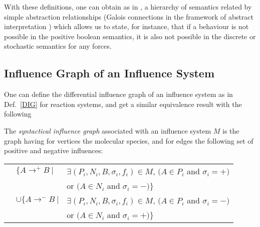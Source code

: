 \documentclass{llncs}
\newcommand{\ra}{\rightarrow}
\begin{document}
With these definitions, one can obtain as in \cite{FS08tcs}, a hierarchy of semantics related by simple abstraction relationships (Galois connections in the framework of abstract interpretation \cite{CC77popl})
which allows us to state, for instance, that if a behaviour is not possible in the positive boolean semantics, it is also not possible in the discrete or stochastic semantics for any forces.


\subsection{Influence Graph of an Influence System}

One can define the differential influence graph of an influence system
as in Def.~\ref{DIG} for reaction systems, and get a similar equivalence result with the following

\begin{definition}

The \emph{syntactical influence graph} associated with an influence system $M$ is
the graph having for vertices the molecular species, and for edges the
following set of positive and negative influences:

\begin{tabular}{lll}
&$\{A\ra^+B\ |$&$\exists (P_i, N_i, B, \sigma_i, f_i)\in M$, $(A\in P_i$ and $\sigma_i=+)$\\
&& or $(A\in N_i$ and $\sigma_i=-)\}$\\
&$\cup\{A\ra^-B\ |$&$\exists (P_i, N_i, B, \sigma_i, f_i)\in M$, $(A\in P_i$ and $\sigma_i=-)$ \\
&&or $(A\in N_i$ and $\sigma_i=+)\}$\\
\end{tabular}

\end{definition}
\end{document}
